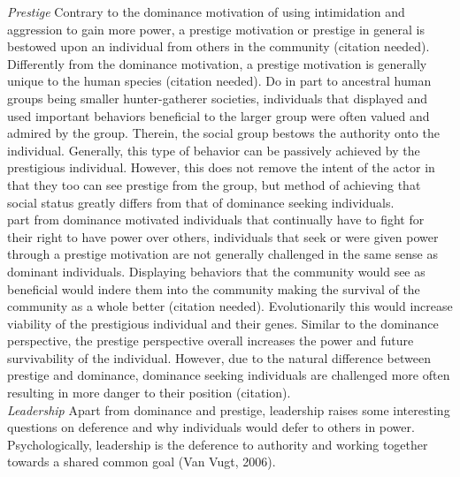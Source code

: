 \documentclass[
  english,
  a4paper]{apa7}
\begin{document}
\emph{Prestige}
Contrary to the dominance motivation of using intimidation and aggression to gain more power, a prestige motivation or prestige in general is bestowed upon an individual from others in the community (citation needed). Differently from the dominance motivation, a prestige motivation is generally unique to the human species (citation needed). Do in part to ancestral human groups being smaller hunter-gatherer societies, individuals that displayed and used important behaviors beneficial to the larger group were often valued and admired by the group. Therein, the social group bestows the authority onto the individual. Generally, this type of behavior can be passively achieved by the prestigious individual. However, this does not remove the intent of the actor in that they too can see prestige from the group, but method of achieving that social status greatly differs from that of dominance seeking individuals.\\
part from dominance motivated individuals that continually have to fight for their right to have power over others, individuals that seek or were given power through a prestige motivation are not generally challenged in the same sense as dominant individuals. Displaying behaviors that the community would see as beneficial would indere them into the community making the survival of the community as a whole better (citation needed). Evolutionarily this would increase viability of the prestigious individual and their genes. Similar to the dominance perspective, the prestige perspective overall increases the power and future survivability of the individual. However, due to the natural difference between prestige and dominance, dominance seeking individuals are challenged more often resulting in more danger to their position (citation).\\

\emph{Leadership}
Apart from dominance and prestige, leadership raises some interesting questions on deference and why individuals would defer to others in power. Psychologically, leadership is the deference to authority and working together towards a shared common goal (Van Vugt, 2006).
\end{document}
